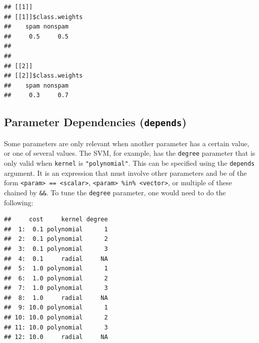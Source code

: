 \documentclass[
]{scrbook}
\newenvironment{Shaded}{\begin{snugshade}}{\end{snugshade}}
\newcommand{\AttributeTok}[1]{\textcolor[rgb]{0.77,0.63,0.00}{#1}}
\newcommand{\ConstantTok}[1]{\textcolor[rgb]{0.00,0.00,0.00}{#1}}
\newcommand{\ControlFlowTok}[1]{\textcolor[rgb]{0.13,0.29,0.53}{\textbf{#1}}}
\newcommand{\DecValTok}[1]{\textcolor[rgb]{0.00,0.00,0.81}{#1}}
\newcommand{\FunctionTok}[1]{\textcolor[rgb]{0.00,0.00,0.00}{#1}}
\newcommand{\NormalTok}[1]{#1}
\newcommand{\OtherTok}[1]{\textcolor[rgb]{0.56,0.35,0.01}{#1}}
\newcommand{\SpecialCharTok}[1]{\textcolor[rgb]{0.00,0.00,0.00}{#1}}
\newcommand{\StringTok}[1]{\textcolor[rgb]{0.31,0.60,0.02}{#1}}
\renewenvironment{Shaded} {\begin{snugshade}\small} {\end{snugshade}}
\begin{document}
\begin{verbatim}
## [[1]]
## [[1]]$class.weights
##    spam nonspam 
##     0.5     0.5 
## 
## 
## [[2]]
## [[2]]$class.weights
##    spam nonspam 
##     0.3     0.7
\end{verbatim}

\hypertarget{searchspace-depends}{%
\subsection{\texorpdfstring{Parameter Dependencies (\texttt{depends})}{Parameter Dependencies (depends)}}\label{searchspace-depends}}

Some parameters are only relevant when another parameter has a certain value, or one of several values.
The SVM, for example, has the \texttt{degree} parameter that is only valid when \texttt{kernel} is \texttt{"polynomial"}.
This can be specified using the \texttt{depends} argument.
It is an expression that must involve other parameters and be of the form \texttt{\textless{}param\textgreater{}\ ==\ \textless{}scalar\textgreater{}}, \texttt{\textless{}param\textgreater{}\ \%in\%\ \textless{}vector\textgreater{}}, or multiple of these chained by \texttt{\&\&}.
To tune the \texttt{degree} parameter, one would need to do the following:

\begin{Shaded}
\end{Shaded}

\begin{verbatim}
##     cost     kernel degree
##  1:  0.1 polynomial      1
##  2:  0.1 polynomial      2
##  3:  0.1 polynomial      3
##  4:  0.1     radial     NA
##  5:  1.0 polynomial      1
##  6:  1.0 polynomial      2
##  7:  1.0 polynomial      3
##  8:  1.0     radial     NA
##  9: 10.0 polynomial      1
## 10: 10.0 polynomial      2
## 11: 10.0 polynomial      3
## 12: 10.0     radial     NA
\end{verbatim}
\end{document}
